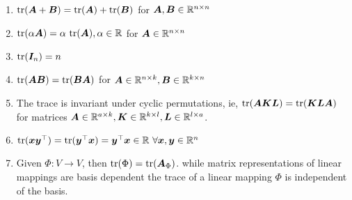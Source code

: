 \begin{enumerate}
    \item $\text{tr}(\bm{A} + \bm{B}) = \text{tr}(\bm{A}) + \text{tr}(\bm{B})$ for $\bm{A}, \bm{B} \in \mathbb{R}^{n\times n}$
    \hfill \cite{mfml/book/mml/Deisenroth-Faisal-Ong}

    \item $\tr(\alpha \bm{A}) = \alpha\ \tr(\bm{A}), \alpha \in \mbbR$ for $\bm{A} \in \mathbb{R}^{n\times n}$
    \hfill \cite{mfml/book/mml/Deisenroth-Faisal-Ong}

    \item $\text{tr}(\bm{I}_n) = n$
    \hfill \cite{mfml/book/mml/Deisenroth-Faisal-Ong}

    \item $\text{tr}(\bm{AB}) = \text{tr}(\bm{BA})$ for $\bm{A} \in \mathbb{R}^{n\times k}, \bm{B} \in \mathbb{R}^{k\times n}$
    \hfill \cite{mfml/book/mml/Deisenroth-Faisal-Ong}

    \item The trace is invariant under cyclic permutations, ie, $\text{tr}(\bm{AKL}) = \text{tr}(\bm{KLA})$ for matrices $\bm{A} \in  \mathbb{R}^{a \times k}, \bm{K} \in  \mathbb{R}^{k \times l}, \bm{L} \in  \mathbb{R}^{l \times a}$.
    \hfill \cite{mfml/book/mml/Deisenroth-Faisal-Ong}

    \item $
        \text{tr}(\bm{xy}^\top) = \text{tr}(\bm{y} ^\top \bm{x}) = \bm{y} ^\top \bm{x} \in \mathbb{R}\
        \forall \bm{x}, \bm{y} \in \mathbb{R}^n
    $
    \hfill \cite{mfml/book/mml/Deisenroth-Faisal-Ong}

    \item Given $\Phi : V \to V$, then $\text{tr}(\Phi) = \text{tr}(\bm{A}_\Phi)$. while matrix representations of linear mappings are basis dependent the trace of a linear mapping $\Phi$ is independent of the basis.
    \hfill \cite{mfml/book/mml/Deisenroth-Faisal-Ong}
\end{enumerate}







